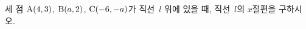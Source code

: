 세 점 $\mathrm{A}(4{,}\mkern3mu\mathopen{}3)$, $\mathrm{B}(a{,}\mkern3mu\mathopen{}2)$, $\mathrm{C}(-6{,}\mkern3mu\mathopen{}-a)$가 직선~$l$ 위에 있을 때, 직선~$l$의 $x$절편을 구하시오. 
